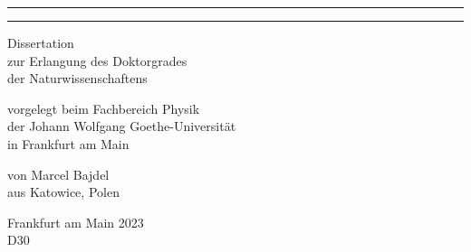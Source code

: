 \begin{titlepage}
\vspace*{1.5cm}
  \begin{center} 
\noindent


\noindent\color{auburn}\rule{12cm}{1pt}
\noindent\color{auburn}\rule{8cm}{1pt}
  \end{center}
  
\vspace*{2cm}

  \begin{center} \sffamily\large
    Dissertation\\
    zur Erlangung des Doktorgrades\\
    der Naturwissenschaftens
  \end{center}

  \vspace*{2cm}

  \begin{center} \sffamily\large
    vorgelegt beim Fachbereich Physik\\
    der Johann Wolfgang Goethe-Universit\"at\\
    in Frankfurt am Main
  \end{center}

  \vspace*{2cm}

  \begin{center} \sffamily\large
    von
    Marcel Bajdel\\
    aus Katowice, Polen
  \end{center}

  \vspace*{2cm}

  \begin{center} \sffamily\large
    Frankfurt am Main 2023\\
    D30
  \end{center}


\end{titlepage}
